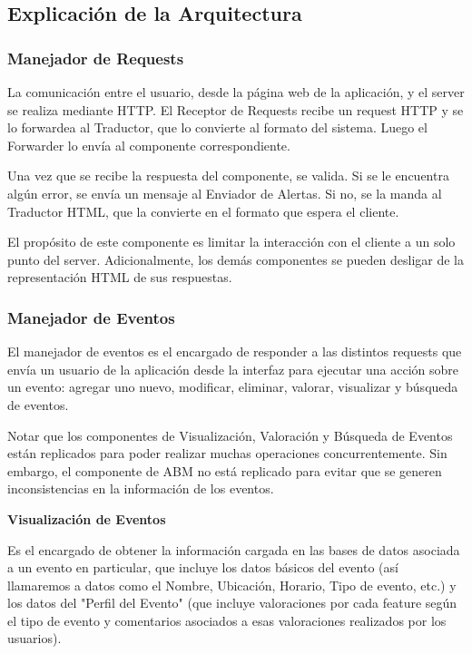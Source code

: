 \subsection{Explicación de la Arquitectura}

\subsubsection{Manejador de Requests}

La comunicación entre el usuario, desde la página web de la aplicación, y el server se realiza mediante HTTP. El Receptor de Requests recibe un request HTTP y se lo forwardea al Traductor, que lo convierte al formato del sistema. Luego el Forwarder lo envía al componente correspondiente.

Una vez que se recibe la respuesta del componente, se valida. Si se le encuentra algún error, se envía un mensaje al Enviador de Alertas. Si no, se la manda al Traductor HTML, que la convierte en el formato que espera el cliente.

El propósito de este componente es limitar la interacción con el cliente a un solo punto del server. Adicionalmente, los demás componentes se pueden desligar de la representación HTML de sus respuestas.

\subsubsection{Manejador de Eventos}

El manejador de eventos es el encargado de responder a las distintos requests que envía un usuario de la aplicación desde la interfaz para ejecutar una acción sobre un evento: agregar uno nuevo, modificar, eliminar, valorar, visualizar y búsqueda de eventos.

Notar que los componentes de Visualización, Valoración y Búsqueda de Eventos están replicados para poder realizar muchas operaciones concurrentemente. Sin embargo, el componente de ABM no está replicado para evitar que se generen inconsistencias en la información de los eventos.

\textbf{Visualización de Eventos}

Es el encargado de obtener la información cargada en las bases de datos asociada a un evento en particular, que incluye los datos básicos del evento (así llamaremos a datos como el Nombre, Ubicación, Horario, Tipo de evento, etc.) y los datos del "Perfil del Evento" (que incluye valoraciones por cada feature según el tipo de evento y comentarios asociados a esas valoraciones realizados por los usuarios).

